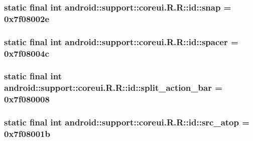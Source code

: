 \hypertarget{classandroid_1_1support_1_1coreui_1_1_r_1_1id_f21f7463d4a0c14e498ff4195337fdf4}{
\subsubsection[{snap}]{\setlength{\rightskip}{0pt plus 5cm}static final int android::support::coreui.R.R::id::snap = 0x7f08002e}}
\label{classandroid_1_1support_1_1coreui_1_1_r_1_1id_f21f7463d4a0c14e498ff4195337fdf4}


\hypertarget{classandroid_1_1support_1_1coreui_1_1_r_1_1id_2716a5f91763919f4698a18c488aa2a7}{
\subsubsection[{spacer}]{\setlength{\rightskip}{0pt plus 5cm}static final int android::support::coreui.R.R::id::spacer = 0x7f08004c}}
\label{classandroid_1_1support_1_1coreui_1_1_r_1_1id_2716a5f91763919f4698a18c488aa2a7}


\hypertarget{classandroid_1_1support_1_1coreui_1_1_r_1_1id_b3f5c457bdfdc386858b9c48f7a61e1e}{
\subsubsection[{split\_\-action\_\-bar}]{\setlength{\rightskip}{0pt plus 5cm}static final int android::support::coreui.R.R::id::split\_\-action\_\-bar = 0x7f080008}}
\label{classandroid_1_1support_1_1coreui_1_1_r_1_1id_b3f5c457bdfdc386858b9c48f7a61e1e}


\hypertarget{classandroid_1_1support_1_1coreui_1_1_r_1_1id_25dfb88a6fc17664cf657de665f021a0}{
\subsubsection[{src\_\-atop}]{\setlength{\rightskip}{0pt plus 5cm}static final int android::support::coreui.R.R::id::src\_\-atop = 0x7f08001b}}
\label{classandroid_1_1support_1_1coreui_1_1_r_1_1id_25dfb88a6fc17664cf657de665f021a0}


